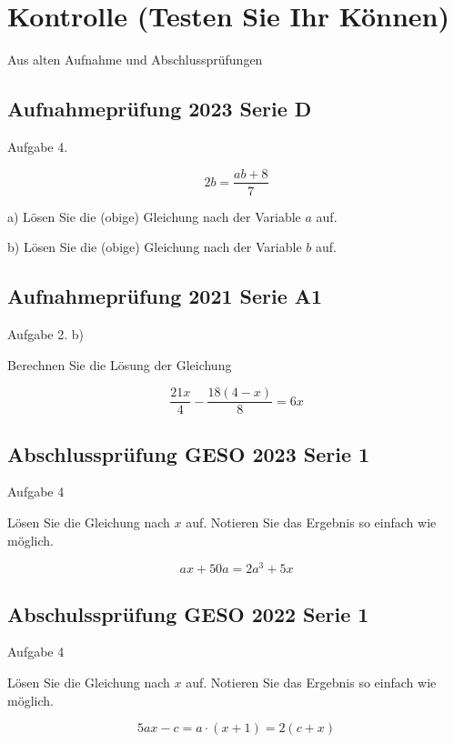 \section{Kontrolle (Testen Sie Ihr Können)}

Aus alten Aufnahme und Abschlussprüfungen

\subsection{Aufnahmeprüfung 2023 Serie D}
Aufgabe 4.

$$2b = \frac{ab+8}{7}$$

a) Lösen Sie die (obige) Gleichung nach der Variable $a$ auf.


b) Lösen Sie die (obige) Gleichung nach der Variable $b$ auf.


\subsection{Aufnahmeprüfung 2021 Serie A1}
Aufgabe 2. b)

Berechnen Sie die Lösung der Gleichung

$$\frac{21x}{4} - \frac{18(4-x)}{8} = 6x$$


\subsection{Abschlussprüfung GESO 2023 Serie 1}
Aufgabe 4

Lösen Sie die Gleichung nach $x$ auf. Notieren Sie das Ergebnis so
einfach wie möglich.

$$ax + 50a = 2a^3 + 5x$$


\subsection{Abschulssprüfung GESO 2022 Serie 1}
Aufgabe 4

Lösen Sie die Gleichung nach $x$ auf. Notieren Sie das Ergebnis so
einfach wie möglich.

$$5ax - c = a\cdot{}(x+1) = 2(c+x)$$


